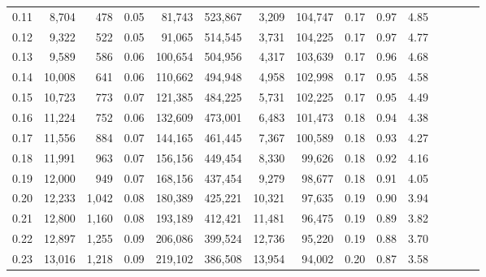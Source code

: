\begin{tabular}{rrrcrrrrrrrrrrr}
0.11 &   8,704 &    478 &                                       0.05 &   81,743 &  523,867 &    3,209 &  104,747 &  0.17 &  0.97 &                         4.85 \\
0.12 &   9,322 &    522 &                                       0.05 &   91,065 &  514,545 &    3,731 &  104,225 &  0.17 &  0.97 &                         4.77 \\
0.13 &   9,589 &    586 &                                       0.06 &  100,654 &  504,956 &    4,317 &  103,639 &  0.17 &  0.96 &                         4.68 \\
0.14 &  10,008 &    641 &                                       0.06 &  110,662 &  494,948 &    4,958 &  102,998 &  0.17 &  0.95 &                         4.58 \\
0.15 &  10,723 &    773 &                                       0.07 &  121,385 &  484,225 &    5,731 &  102,225 &  0.17 &  0.95 &                         4.49 \\
0.16 &  11,224 &    752 &                                       0.06 &  132,609 &  473,001 &    6,483 &  101,473 &  0.18 &  0.94 &                         4.38 \\
0.17 &  11,556 &    884 &                                       0.07 &  144,165 &  461,445 &    7,367 &  100,589 &  0.18 &  0.93 &                         4.27 \\
0.18 &  11,991 &    963 &                                       0.07 &  156,156 &  449,454 &    8,330 &   99,626 &  0.18 &  0.92 &                         4.16 \\
0.19 &  12,000 &    949 &                                       0.07 &  168,156 &  437,454 &    9,279 &   98,677 &  0.18 &  0.91 &                         4.05 \\
0.20 &  12,233 &  1,042 &                                       0.08 &  180,389 &  425,221 &   10,321 &   97,635 &  0.19 &  0.90 &                         3.94 \\
0.21 &  12,800 &  1,160 &                                       0.08 &  193,189 &  412,421 &   11,481 &   96,475 &  0.19 &  0.89 &                         3.82 \\
0.22 &  12,897 &  1,255 &                                       0.09 &  206,086 &  399,524 &   12,736 &   95,220 &  0.19 &  0.88 &                         3.70 \\
0.23 &  13,016 &  1,218 &                                       0.09 &  219,102 &  386,508 &   13,954 &   94,002 &  0.20 &  0.87 &                         3.58 \\

\end{tabular}
